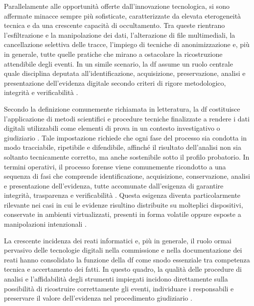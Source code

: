Parallelamente alle opportunità offerte dall'innovazione tecnologica, si sono affermate minacce sempre più sofisticate, caratterizzate da elevata eterogeneità tecnica e da una crescente capacità di occultamento. Tra queste rientrano l'esfiltrazione e la manipolazione dei dati, l'alterazione di file multimediali, la cancellazione selettiva delle tracce, l'impiego di tecniche di anonimizzazione e, più in generale, tutte quelle pratiche che mirano a ostacolare la ricostruzione attendibile degli eventi. In un simile scenario, la \gls{df} assume un ruolo centrale quale disciplina deputata all'identificazione, acquisizione, preservazione, analisi e presentazione dell'evidenza digitale secondo criteri di rigore metodologico, integrità e verificabilità \cite{palmer2001road,reith2002examining,nist2006guide,iso27037}.

Secondo la definizione comunemente richiamata in letteratura, la \gls{df} costituisce l'applicazione di metodi scientifici e procedure tecniche finalizzate a rendere i dati digitali utilizzabili come elementi di prova in un contesto investigativo o giudiziario \cite{palmer2001road}. Tale impostazione richiede che ogni fase del processo sia condotta in modo tracciabile, ripetibile e difendibile, affinché il risultato dell'analisi non sia soltanto tecnicamente corretto, ma anche sostenibile sotto il profilo probatorio. In termini operativi, il processo forense viene comunemente ricondotto a una sequenza di fasi che comprende identificazione, acquisizione, conservazione, analisi e presentazione dell'evidenza, tutte accomunate dall'esigenza di garantire integrità, trasparenza e verificabilità \cite{reith2002examining,nist2006guide}. Questa esigenza diventa particolarmente rilevante nei casi in cui le evidenze risultino distribuite su molteplici dispositivi, conservate in ambienti virtualizzati, presenti in forma volatile oppure esposte a manipolazioni intenzionali \cite{nist2006guide,iso27037}.

La crescente incidenza dei reati informatici e, più in generale, il ruolo ormai pervasivo delle tecnologie digitali nella commissione e nella documentazione dei reati hanno consolidato la funzione della \gls{df} come snodo essenziale tra competenza tecnica e accertamento dei fatti. In questo quadro, la qualità delle procedure di analisi e l'affidabilità degli strumenti impiegati incidono direttamente sulla possibilità di ricostruire correttamente gli eventi, individuare i responsabili e preservare il valore dell'evidenza nel procedimento giudiziario \cite{costantini2019digital,clough2015principles,europol2019iocta}.


